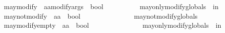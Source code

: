 \begin{isabellebody}
\isanewline
\ \ {\isachardoublequoteopen}{\isacharunderscore}may{\isacharunderscore}modify{\isachardoublequoteclose}\ {\isacharcolon}{\isacharcolon}\ {\isachardoublequoteopen}{\isacharbrackleft}{\isacharprime}a{\isacharcomma}{\isacharprime}a{\isacharcomma}modifyargs{\isacharbrackright}\ {\isasymRightarrow}\ bool{\isachardoublequoteclose}\ \isanewline
\ \ \ \ \ \ \ \ {\isacharparenleft}{\isachardoublequoteopen}{\isacharunderscore}\ may{\isacharprime}{\isacharunderscore}only{\isacharprime}{\isacharunderscore}modify{\isacharprime}{\isacharunderscore}globals\ {\isacharunderscore}\ in\ {\isacharbrackleft}{\isacharunderscore}{\isacharbrackright}{\isachardoublequoteclose}\ {\isacharbrackleft}{}{}{}{\isacharcomma}{}{}{}{\isacharcomma}{}{\isacharbrackright}\ {}{}{}{\isacharparenright}\isanewline
\ \ {\isachardoublequoteopen}{\isacharunderscore}may{\isacharunderscore}not{\isacharunderscore}modify{\isachardoublequoteclose}\ {\isacharcolon}{\isacharcolon}\ {\isachardoublequoteopen}{\isacharbrackleft}{\isacharprime}a{\isacharcomma}{\isacharprime}a{\isacharbrackright}\ {\isasymRightarrow}\ bool{\isachardoublequoteclose}\ \ \ \ \ \ \isanewline
\ \ \ \ \ \ \ \ {\isacharparenleft}{\isachardoublequoteopen}{\isacharunderscore}\ may{\isacharprime}{\isacharunderscore}not{\isacharprime}{\isacharunderscore}modify{\isacharprime}{\isacharunderscore}globals\ {\isacharunderscore}{\isachardoublequoteclose}\ {\isacharbrackleft}{}{}{}{\isacharcomma}{}{}{}{\isacharbrackright}\ {}{}{}{\isacharparenright}\isanewline
\ \ {\isachardoublequoteopen}{\isacharunderscore}may{\isacharunderscore}modify{\isacharunderscore}empty{\isachardoublequoteclose}\ {\isacharcolon}{\isacharcolon}\ {\isachardoublequoteopen}{\isacharbrackleft}{\isacharprime}a{\isacharcomma}{\isacharprime}a{\isacharbrackright}\ {\isasymRightarrow}\ bool{\isachardoublequoteclose}\ \ \ \ \ \ \isanewline
\ \ \ \ \ \ \ \ {\isacharparenleft}{\isachardoublequoteopen}{\isacharunderscore}\ may{\isacharprime}{\isacharunderscore}only{\isacharprime}{\isacharunderscore}modify{\isacharprime}{\isacharunderscore}globals\ {\isacharunderscore}\ in\ {\isacharbrackleft}{\isacharbrackright}{\isachardoublequoteclose}\ {\isacharbrackleft}{}{}{}{\isacharcomma}{}{}{}{\isacharbrackright}\ {}{}{}{\isacharparenright}\isanewline

\end{isabellebody}

